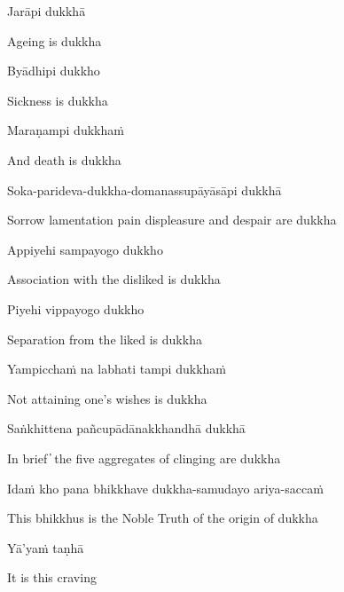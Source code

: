 Jarāpi dukkhā

\begin{cprenglish}
  Ageing is dukkha
\end{cprenglish}

Byādhipi dukkho

\begin{cprenglish}
  Sickness is dukkha
\end{cprenglish}

Maraṇampi dukkhaṁ

\begin{cprenglish}
  And death is dukkha
\end{cprenglish}

Soka-parideva-dukkha-domanassupāyāsāpi dukkhā

\begin{cprenglish}
  Sorrow lamentation pain displeasure and despair are dukkha
\end{cprenglish}

Appiyehi sampayogo dukkho

\begin{cprenglish}
  Association with the disliked is dukkha
\end{cprenglish}

Piyehi vippayogo dukkho

\begin{cprenglish}
  Separation from the liked is dukkha
\end{cprenglish}

Yampicchaṁ na labhati tampi dukkhaṁ

\begin{cprenglish}
  Not attaining one’s wishes is dukkha
\end{cprenglish}

Saṅkhittena pañcupādānakkhandhā dukkhā

\begin{cprenglish}
  In brief  ̓  the five aggregates of clinging are dukkha
\end{cprenglish}

Idaṁ kho pana bhikkhave dukkha-samudayo ariya-saccaṁ

\begin{cprenglish}
  This bhikkhus is the Noble Truth of the origin of dukkha
\end{cprenglish}

Yā’yaṁ taṇhā

\begin{cprenglish}
  It is this craving
\end{cprenglish}


